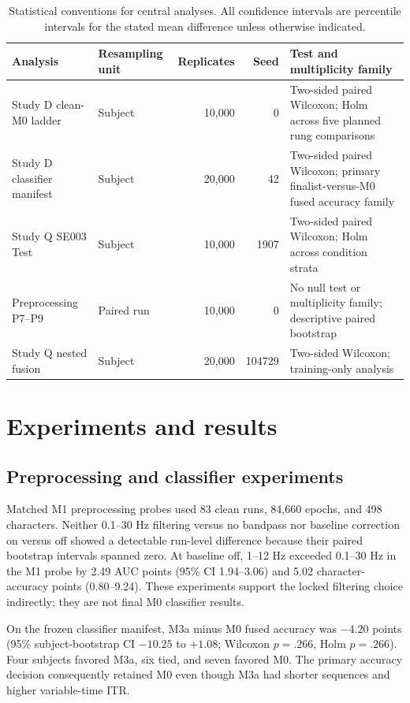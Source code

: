 \documentclass[final,5p,times,twocolumn,authoryear]{elsarticle}
\begin{document}
\begin{table}[t]
\centering\small
\caption{Statistical conventions for central analyses. All confidence intervals are percentile intervals for the stated mean difference unless otherwise indicated.}\label{tab:statistics}
\begin{tabular}{p{}p{}rrp{}}
\toprule
Analysis & Resampling unit & Replicates & Seed & Test and multiplicity family\\
\midrule
Study D clean-M0 ladder & Subject & 10,000 & 0 & Two-sided paired Wilcoxon; Holm across five planned rung comparisons\\
Study D classifier manifest & Subject & 20,000 & 42 & Two-sided paired Wilcoxon; primary finalist-versus-M0 fused accuracy family\\
Study Q SE003 Test & Subject & 10,000 & 1907 & Two-sided paired Wilcoxon; Holm across condition strata\\
Preprocessing P7--P9 & Paired run & 10,000 & 0 & No null test or multiplicity family; descriptive paired bootstrap\\
Study Q nested fusion & Subject & 20,000 & 104729 & Two-sided Wilcoxon; training-only analysis\\
\bottomrule
\end{tabular}
\end{table}

\section{Experiments and results}
\subsection{Preprocessing and classifier experiments}
Matched M1 preprocessing probes used 83 clean runs, 84,660 epochs, and 498 characters. Neither 0.1--30 Hz filtering versus no bandpass nor baseline correction on versus off showed a detectable run-level difference because their paired bootstrap intervals spanned zero. At baseline off, 1--12 Hz exceeded 0.1--30 Hz in the M1 probe by 2.49 AUC points (95\% CI 1.94--3.06) and 5.02 character-accuracy points (0.80--9.24). These experiments support the locked filtering choice indirectly; they are not final M0 classifier results.

On the frozen classifier manifest, M3a minus M0 fused accuracy was $-4.20$ points (95\% subject-bootstrap CI $-10.25$ to $+1.08$; Wilcoxon $p=.266$, Holm $p=.266$). Four subjects favored M3a, six tied, and seven favored M0. The primary accuracy decision consequently retained M0 even though M3a had shorter sequences and higher variable-time ITR.
\end{document}

